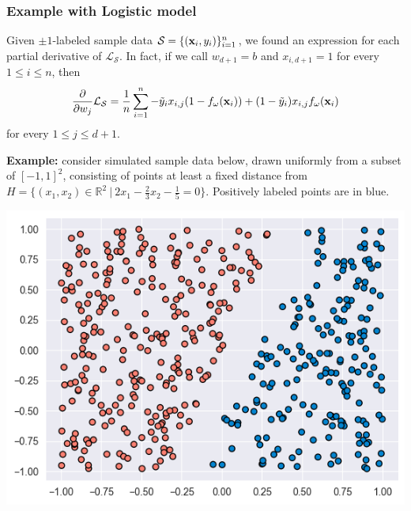 \documentclass[smaller]{beamer}
\theoremstyle{example}
\begin{document}
\begin{frame}
    \frametitle{Example with Logistic model}
    Given $\pm1$-labeled sample data $\mathcal S= \{({\bf x}_i, y_i)\}_{i=1}^n$, we found an expression for each partial derivative of $\mathcal L_{\mathcal S}$. In fact, if we call $w_{d+1} = b$ and $x_{i,d+1} = 1$ for every $1\le i\le n$, then 
        {\small 
        \[\frac{\partial}{\partial w_{j}}\mathcal L_{\mathcal S} = \frac1n\sum_{i=1}^n-\tilde y_ix_{i,j}(1-f_{\omega}({\bf x}_i)) + (1-\tilde y_i)x_{i,j}f_{\omega}({\bf x}_i)\]
        }
    for every $1\le j\le d+1$.

    \pause
    \textbf{Example:} consider simulated sample data below, drawn uniformly from a subset of $[-1,1]^2$, consisting of points at least a fixed distance from $H = \{(x_1,x_2)\in\mathbb R^2\ |\ 2x_1 - \frac23x_2 - \frac15=0\}$. Positively labeled points are in blue. 
    \vspace*{11pt}

    \centering
    \includegraphics[height=0.3\textheight]{../../Images/simulated-logregression-data.png}
\end{frame}
\end{document}
